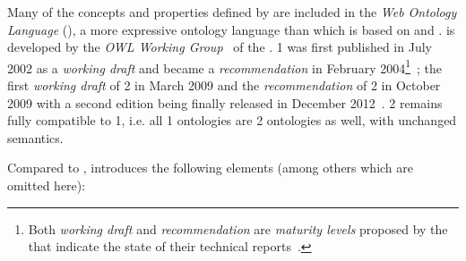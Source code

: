 \noindent{}

Many of the concepts and properties defined by  are included in the \emph{Web Ontology Language} (), a more expressive ontology language than  which is based on  and .  is developed by the \emph{OWL Working Group}~\cite{OWL-working-group} of the .  1 was first published in July 2002 as a \emph{working draft} and became a  \emph{recommendation} in February 2004\footnote{Both \emph{working draft} and \emph{recommendation} are \emph{maturity levels} proposed by the  that indicate the state of their technical reports~\cite{w3c-process}.}~\cite{OWL1}; the first \emph{working draft} of  2 in March 2009 and the  \emph{recommendation} of  2 in October 2009 with a second edition being finally released in December 2012~\cite{OWL}.
 2 remains fully compatible to  1, i.e. all  1 ontologies are  2 ontologies as well, with unchanged semantics.

Compared to ,  introduces the following elements (among others which are omitted here):

